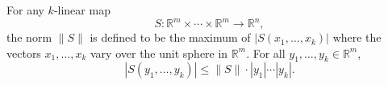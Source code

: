 For any $k$-linear map
$$S: \mathbb{R}^m \times \cdots \times \mathbb{R}^m \to \mathbb{R}^n,$$
the norm $\|S\|$ is defined to be the maximum of $|S(x_1, \ldots, x_k)|$ where the vectors $x_1, \ldots, x_k$ vary over the unit sphere in $\mathbb{R}^m$. For all $y_1, \ldots, y_k \in \mathbb{R}^m$,
$$|S(y_1, \ldots, y_k)| \leqslant \|S\| \cdot |y_1| \cdots |y_k|.$$
